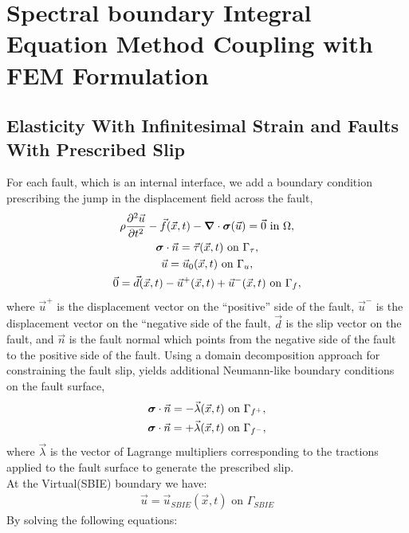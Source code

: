 \chapter{Spectral boundary Integral Equation Method Coupling with FEM Formulation}
\label{cha:sbiefemcoupling:formulation}

\section{Elasticity With Infinitesimal Strain and Faults With Prescribed Slip}

For each fault, which is an internal interface, we add a boundary
condition prescribing the jump in the displacement field across the
fault,
\begin{gather}
\rho \frac{\partial^2\vec{u}}{\partial t^2} - \vec{f}(\vec{x},t) - \tensor{\nabla} \cdot 
\tensor{\sigma}
(\vec{u}) = \vec{0} \text{ in }\Omega, \\
%
\tensor{\sigma} \cdot \vec{n} = \vec{\tau}(\vec{x},t) \text{ on }\Gamma_\tau, \\
%
\vec{u} = \vec{u}_0(\vec{x},t) \text{ on }\Gamma_u, \\
%
\label{eqn:bc:prescribed_slip}
\vec{0} = \vec{d}(\vec{x},t) - \vec{u}^+(\vec{x},t) + \vec{u}^-(\vec{x},t) \text{ on }\Gamma_f,
\end{gather}
where $\vec{u}^+$ is the displacement vector on the ``positive'' side
of the fault, $\vec{u}^-$ is the displacement vector on the ``negative
side of the fault, $\vec{d}$ is the slip vector on the fault, and
$\vec{n}$ is the fault normal which points from the negative side of
the fault to the positive side of the fault. Using a domain
decomposition approach for constraining the fault slip, yields
additional Neumann-like boundary conditions on the fault surface,
\begin{gather}
\bm{\sigma} \cdot \vec{n} = -\vec{\lambda}(\vec{x},t) \text{ on }\Gamma_{f^+}, \\
\bm{\sigma} \cdot \vec{n} = +\vec{\lambda}(\vec{x},t) \text{ on }\Gamma_{f^-},
\end{gather}
where $\vec{\lambda}$ is the vector of Lagrange multipliers
corresponding to the tractions applied to the fault surface to
generate the prescribed slip.\\
At the Virtual(SBIE) boundary we have: 
\begin{gather}
\vec{u} = \vec{u}_{SBIE}(\vec{x},t) \text{ on }\Gamma_{SBIE}
\end{gather}
By solving the following equations: 
